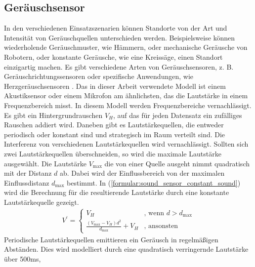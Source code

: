 \subsection{Geräuschsensor}
In den verschiedenen Einsatzszenarien können Standorte von der Art und Intensität von Geräuschquellen unterschieden werden.
Beispielsweise können wiederholende Geräuschmuster, wie Hämmern, oder mechanische Geräusche von Robotern,
oder konstante Geräusche, wie eine Kreissäge, einen Standort einzigartig machen.
\newline
\newline
Es gibt verschiedene Arten von Geräuschsensoren, z. B. Geräuschrichtungssensoren \cite{tiete2014soundcompass} oder
spezifische Anwendungen, wie Herzgeräuschsensoren \cite{zhang2016design}.
Das in dieser Arbeit verwendete Modell ist einem Akustiksensor \cite{sessler1991acoustic} oder einem Mikrofon am ähnlichsten,
das die Lautstärke in einem Frequenzbereich misst.
\newline
\newline
In diesem Modell werden Frequenzbereiche vernachlässigt.
Es gibt ein Hintergrundrauschen $V_H$, auf das für jeden Datensatz ein zufälliges Rauschen addiert wird.
Daneben gibt es Lautstärkequellen, die entweder periodisch oder konstant sind und strategisch im Raum verteilt sind.
Die Interferenz von verschiedenen Lautstärkequellen wird vernachlässigt.
Sollten sich zwei Lautstärkequellen überschneiden, so wird die maximale Lautstärke ausgewählt.
\newline
\newline
Die Lautstärke $V_{\max}$ die von einer Quelle ausgeht nimmt quadratisch mit der Distanz $d$ ab.
Dabei wird der Einflussbereich von der maximalen Einflussdistanz $d_{\max}$ bestimmt.
In (\ref{formular:sound_sensor_constant_sound}) wird die Berechnung für die resultierende Lautstärke durch eine konstante Lautstärkequelle gezeigt.
\begin{align}
    \label{formular:sound_sensor_constant_sound}
    V^{\prime} = \begin{cases}
                     V_H & \text{, wenn } d > d_{\max} \\
                     \frac{(V_{\max} - V_H)d^2}{d_{\max}} + V_H & \text{, ansonsten}
    \end{cases}
\end{align}
\newline
\newline
Periodische Lautstärkequellen emittieren ein Geräusch in regelmäßigen Abständen.
Dies wird modelliert durch eine quadratisch verringernde Lautstärke über 500ms,
